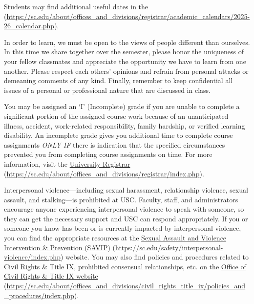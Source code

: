 \documentclass[11pt,letterpaper]{article}
\begin{document}
Students may find additional useful dates in the \href{https://sc.edu/about/offices\_and\_divisions/registrar/academic\_calendars/2025-26\_calendar.php} (\url{https://sc.edu/about/offices\_and\_divisions/registrar/academic\_calendars/2025-26\_calendar.php}). \sectionbreak




In order to learn, we must be open to the views of people different than ourselves. In this time we share together over the semester, please honor the uniqueness of your fellow classmates and appreciate the opportunity we have to learn from one another. Please respect each others' opinions and refrain from personal attacks or demeaning comments of any kind. Finally, remember to keep confidential all issues of a personal or professional nature that are discussed in class. \sectionbreak




You may be assigned an `I' (Incomplete) grade if you are unable to complete a significant portion of the assigned course work because of an unanticipated illness, accident, work-related responsibility, family hardship, or verified learning disability. An incomplete grade gives you additional time to complete course assignments {\itshape ONLY IF} there is indication that the specified circumstances prevented you from completing course assignments on time. For more information, visit the \href{https://sc.edu/about/offices\_and\_divisions/registrar/index.php}{University Registrar} (\url{https://sc.edu/about/offices\_and\_divisions/registrar/index.php}). \sectionbreak




Interpersonal violence---including sexual harassment, relationship violence, sexual assault, and stalking---is prohibited at USC. Faculty, staff, and administrators encourage anyone experiencing interpersonal violence to speak with someone, so they can get the necessary support and USC can respond appropriately. If you or someone you know has been or is currently impacted by interpersonal violence, you can find the appropriate resources at the \href{https://sc.edu/safety/interpersonal-violence/index.php}{Sexual Assault and Violence Intervention \& Prevention (SAVIP)} (\url{https://sc.edu/safety/interpersonal-violence/index.php}) website. You may also find policies and procedures related to Civil Rights \& Title IX, prohibited consensual relationships, etc. on the \href{https://sc.edu/about/offices\_and\_divisions/civil\_rights\_title\_ix/policies\_and\_procedures/index.php}{Office of Civil Rights \& Title IX website} (\url{https://sc.edu/about/offices\_and\_divisions/civil\_rights\_title\_ix/policies\_and\_procedures/index.php}). \pspace
\end{document}
